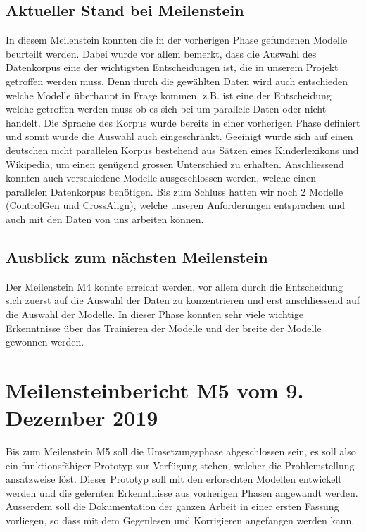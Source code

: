\subsection{Aktueller Stand bei Meilenstein}
In diesem Meilenstein konnten die in der vorherigen Phase gefundenen Modelle beurteilt werden. Dabei wurde vor allem
bemerkt, dass die Auswahl des Datenkorpus eine der wichtigsten Entscheidungen ist, die in unserem Projekt getroffen
werden muss. Denn durch die gewählten Daten wird auch entschieden welche Modelle überhaupt in Frage kommen, z.B. ist
eine der Entscheidung welche getroffen werden muss ob es sich bei um parallele Daten oder nicht handelt. Die Sprache des
Korpus wurde bereits in einer vorherigen Phase definiert und somit wurde die Auswahl auch eingeschränkt. Geeinigt wurde
sich auf einen deutschen nicht parallelen Korpus bestehend aus Sätzen eines Kinderlexikons und Wikipedia, um einen
genügend grossen Unterschied zu erhalten. Anschliessend konnten auch verschiedene Modelle ausgeschlossen werden, welche
einen parallelen Datenkorpus benötigen. Bis zum Schluss hatten wir noch 2 Modelle (ControlGen und CrossAlign), welche
unseren Anforderungen entsprachen und auch mit den Daten von uns arbeiten können.

\subsection{Ausblick zum nächsten Meilenstein}
Der Meilenstein M4 konnte erreicht werden, vor allem durch die Entscheidung sich zuerst auf die Auswahl der Daten zu
konzentrieren und erst anschliessend auf die Auswahl der Modelle. In dieser Phase konnten sehr viele wichtige
Erkenntnisse über das Trainieren der Modelle und der breite der Modelle gewonnen werden.

\section{Meilensteinbericht M5 vom 9. Dezember 2019}
Bis zum Meilenstein M5 soll die Umsetzungsphase abgeschlossen sein, es soll also ein funktionsfähiger Prototyp zur
Verfügung stehen, welcher die Problemstellung ansatzweise löst. Dieser Prototyp soll mit den erforschten Modellen
entwickelt werden und die gelernten Erkenntnisse aus vorherigen Phasen angewandt werden. Ausserdem soll die
Dokumentation der ganzen Arbeit in einer ersten Fassung vorliegen, so dass mit dem Gegenlesen und Korrigieren angefangen
werden kann.

